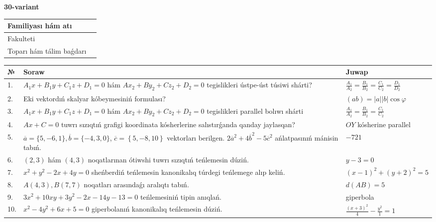 \documentclass{article}
\begin{document}
\egroup

\newpage


\textbf{30-variant}\\

\bgroup
\def\arraystretch{1.6} %

\begin{tabular}{|m{5.7cm}|m{9.5cm}|}
\hline
Familiyası hám atı & \\
\hline
Fakulteti  & \\
\hline
Toparı hám tálim baǵdarı  & \\
\hline
\end{tabular}

\vspace{1cm}

\begin{tabular}{|m{0.7cm}|m{10cm}|m{4cm}|}
\hline
№ & Soraw & Juwap \\
\hline
1. & $A_1x+B_1y+C_1z+D_1=0$ hám $Ax_2+By_2+Cz_2+D_2=0$ tegislikleri ústpe-úst túsiwi shárti? & $\frac{A_1}{A_2}=\frac{B_1}{B_2}=\frac{C_1}{C_2}=\frac{D_1}{D_2}$ \\
\hline
2. & Eki vektordıń skalyar kóbeymesiniń formulası? & $(ab)=|a||b|\cos\varphi$ \\
\hline
3. & $A_1x+B_1y+C_1z+D_1=0$ hám $Ax_2+By_2+Cz_2+D_2=0$ tegislikleri parallel bolıwı shárti & $\frac{A_1}{A_2}=\frac{B_1}{B_2}=\frac{C_1}{C_2}$ \\
\hline
4. & $Ax+C=0$ tuwrı sızıqtıń grafigi koordinata kósherlerine salıstırǵanda qanday jaylasqan? & $OY$ kósherine parallel \\
\hline
5. & $\overline{a}=\{5,-6, 1 \}, \overline{b}=\{-4, 3, 0 \} $, $\overline{c}=\left\{ 5,-8, 10 \right\}$ vektorları berilgen. $2{\overline{a}}^{2}+4{\overline{b}}^{2}-5{\overline{c}}^{2}$ ańlatpasınıń mánisin tabıń. & $-721$ \\
\hline
6. & $(2, 3)$ hám $(4, 3)$ noqatlarınan ótiwshi tuwrı sızıqtıń teńlemesin dúziń. & $ y-3=0$ \\
\hline
7. & $x^{2}+y^{2}-2x+4y=0$ sheńberdiń teńlemesin kanonikalıq túrdegi teńlemege alıp keliń. & $(x-1)^{2}+(y+2)^{2}=5$ \\
\hline
8. & $A(4, 3), B(7, 7)$ noqatları arasındaǵı aralıqtı tabıń. & $d(AB)=5$ \\
\hline
9. & $3x^{2}+10xy+3y^{2}-2x-14y-13=0$ teńlemesiniń tipin anıqlań. & giperbola \\
\hline
10. & $x^{2}-4y^{2}+6x+5=0$ giperbolanıń kanonikalıq teńlemesin dúziń. & $\frac{(x+3)^{2}}{4}-\frac{y^{2}}{1}=1$ \\
\hline
\end{tabular}
\end{document}
